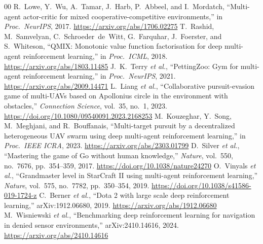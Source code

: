 \documentclass[conference]{IEEEtran}
\begin{document}
\begin{thebibliography}{00}
 R.~Lowe, Y.~Wu, A.~Tamar, J.~Harb, P.~Abbeel, and I.~Mordatch, ``Multi-agent actor-critic for mixed cooperative-competitive environments,'' in \emph{Proc.\ NeurIPS}, 2017. \url{https://arxiv.org/abs/1706.02275}
 T.~Rashid, M.~Samvelyan, C.~Schroeder~de~Witt, G.~Farquhar, J.~Foerster, and S.~Whiteson, ``QMIX: Monotonic value function factorisation for deep multi-agent reinforcement learning,'' in \emph{Proc.\ ICML}, 2018. \url{https://arxiv.org/abs/1803.11485}
 J.~K.~Terry \emph{et al.}, ``PettingZoo: Gym for multi-agent reinforcement learning,'' in \emph{Proc.\ NeurIPS}, 2021. \url{https://arxiv.org/abs/2009.14471}
 L.~Liang \emph{et al.}, ``Collaborative pursuit-evasion game of multi-UAVs based on Apollonius circle in the environment with obstacles,'' \emph{Connection Science}, vol.~35, no.~1, 2023. \url{https://doi.org/10.1080/09540091.2023.2168253}
 M.~Kouzeghar, Y.~Song, M.~Meghjani, and R.~Bouffanais, ``Multi-target pursuit by a decentralized heterogeneous UAV swarm using deep multi-agent reinforcement learning,'' in \emph{Proc.\ IEEE ICRA}, 2023. \url{https://arxiv.org/abs/2303.01799}
 D.~Silver \emph{et al.}, ``Mastering the game of Go without human knowledge,'' \emph{Nature}, vol.~550, no.~7676, pp.~354--359, 2017. \url{https://doi.org/10.1038/nature24270}
 O.~Vinyals \emph{et al.}, ``Grandmaster level in StarCraft II using multi-agent reinforcement learning,'' \emph{Nature}, vol.~575, no.~7782, pp.~350--354, 2019. \url{https://doi.org/10.1038/s41586-019-1724-z}
 C.~Berner \emph{et al.}, ``Dota 2 with large scale deep reinforcement learning,'' arXiv:1912.06680, 2019. \url{https://arxiv.org/abs/1912.06680}
 M.~Wisniewski \emph{et al.}, ``Benchmarking deep reinforcement learning for navigation in denied sensor environments,'' arXiv:2410.14616, 2024. \url{https://arxiv.org/abs/2410.14616}
\end{thebibliography}
\end{document}
